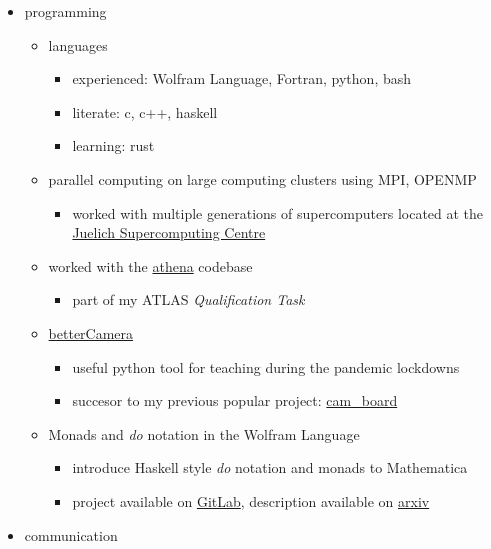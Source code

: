 \documentclass{article}
\providecommand{\tightlist}{%
  \setlength{\itemsep}{0pt}\setlength{\parskip}{0pt}}
\begin{document}
\begin{itemize}
\tightlist
\item
  programming

  \begin{itemize}
  \tightlist
  \item
    languages

    \begin{itemize}
    \tightlist
    \item
      experienced: Wolfram Language, Fortran, python, bash
    \item
      literate: c, c++, haskell
    \item
      learning: rust
    \end{itemize}
  \item
    parallel computing on large computing clusters using MPI, OPENMP

    \begin{itemize}
    \tightlist
    \item
      worked with multiple generations of supercomputers located at the
      \href{https://www.fz-juelich.de/en/ias/jsc/systems/supercomputers}{Juelich
      Supercomputing Centre}
    \end{itemize}
  \item
    worked with the \href{https://gitlab.cern.ch/atlas/athena}{athena}
    codebase

    \begin{itemize}
    \tightlist
    \item
      part of my ATLAS \emph{Qualification Task}
    \end{itemize}
  \item
    \href{https://kacpertopol.github.io/betterCamera/}{betterCamera}

    \begin{itemize}
    \tightlist
    \item
      useful python tool for teaching during the pandemic lockdowns
    \item
      succesor to my previous popular project:
      \href{https://github.com/kacpertopol/cam_board}{cam\_board}
    \end{itemize}
  \item
    Monads and \emph{do} notation in the Wolfram Language

    \begin{itemize}
    \tightlist
    \item
      introduce Haskell style \emph{do} notation and monads to
      Mathematica
    \item
      project available on
      \href{https://gitlab.com/kacpertopolnicki/wlmonad}{GitLab},
      description available on
      \href{https://arxiv.org/abs/2005.09478}{arxiv}
    \end{itemize}
  \end{itemize}
\item
  communication


\end{itemize}
\end{document}
